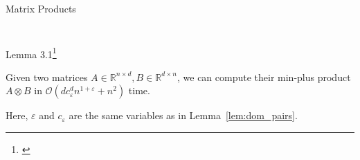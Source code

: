 \begin{frame}{Matrix Products}
{\begin{columns}
\begin{column}{.4\linewidth}
\begin{figure}
                \end{figure}
            \end{column}
        \end{columns}
    }
\end{frame}

\begin{frame}{Lemma 3.1\footnote[1]{\cite{Chan2007}}}
    \begin{lemma}\label{lem:sub_mat_mul}
        Given two matrices $A \in \mathbb{R}^{n \times d}, B \in \mathbb{R}^{d \times n}$, we can compute their min-plus product $A \otimes B$ in $\mathcal{O}\left( d c_\varepsilon^d n^{1 + \varepsilon} + n^2 \right)$ time.

        Here, $\varepsilon$ and $c_\varepsilon$ are the same variables as in Lemma~\ref{lem:dom_pairs}.
    \end{lemma}
\end{frame}

